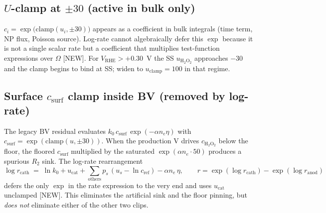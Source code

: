 \documentclass[11pt]{article}
\newcommand{\new}{\textcolor{red!70!black}{[NEW]}}
\newcommand{\Htwo}{\text{H}_2\text{O}_2}
\begin{document}
\subsection{$U$-clamp at $\pm 30$ (active in bulk only)}
\(
  c_i = \exp\!\bigl(\mathrm{clamp}(u_i,\pm 30)\bigr)
\)
appears as a coefficient in bulk integrals (time term, NP flux,
Poisson source).  Log-rate cannot algebraically defer this
$\exp$ because it is not a single scalar rate but a coefficient that
multiplies test-function expressions over $\Omega$ \new{}.
For $V_{\mathrm{RHE}}>+0.30$~V the SS $u_{\Htwo}$ approaches $-30$
and the clamp begins to bind at SS; widen to
$u_{\mathrm{clamp}}=100$ in that regime.

\subsection{Surface $c_{\mathrm{surf}}$ clamp inside BV (removed by log-rate)}
The legacy BV residual evaluates
$k_0\,c_{\mathrm{surf}}\,\exp(-\alpha n_e\eta)$ with
$c_{\mathrm{surf}}=\exp(\mathrm{clamp}(u,\pm 30))$.  When the
production V drives $c_{\Htwo}$ below the floor, the floored
$c_{\mathrm{surf}}$ multiplied by the saturated $\exp(\alpha n_e\cdot 50)$
produces a spurious $R_2$ sink.  The log-rate rearrangement
\begin{equation}
  \log r_{\mathrm{cath}} \;=\; \ln k_0 + u_{\mathrm{cat}}
       + \sum_{\mathrm{others}} p_s\,(u_s-\ln c_{\mathrm{ref}})
       - \alpha n_e\,\eta,
   \qquad r = \exp(\log r_{\mathrm{cath}}) - \exp(\log r_{\mathrm{anod}})
   \label{eq:lograte}
\end{equation}
defers the only $\exp$ in the rate expression to the very end and
uses $u_{\mathrm{cat}}$ unclamped \new{}.  This eliminates the
artificial sink and the floor pinning, but \emph{does not} eliminate
either of the other two clips.
\end{document}
